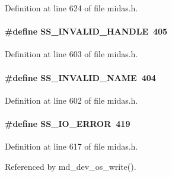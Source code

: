\begin{DoxyItemize}
\item 
\end{DoxyItemize}

Definition at line 624 of file midas.h.
\paragraph[{SS\_\-INVALID\_\-HANDLE}]{\setlength{\rightskip}{0pt plus 5cm}\#define SS\_\-INVALID\_\-HANDLE~405}\hfill\label{group__err24_ga43a0d1263dfc7b732dbb04271d8599c9}

\begin{DoxyItemize}
\item 
\end{DoxyItemize}

Definition at line 603 of file midas.h.
\paragraph[{SS\_\-INVALID\_\-NAME}]{\setlength{\rightskip}{0pt plus 5cm}\#define SS\_\-INVALID\_\-NAME~404}\hfill\label{group__err24_ga77e57c8c5c8a676e50f7b757294044f5}

\begin{DoxyItemize}
\item 
\end{DoxyItemize}

Definition at line 602 of file midas.h.
\paragraph[{SS\_\-IO\_\-ERROR}]{\setlength{\rightskip}{0pt plus 5cm}\#define SS\_\-IO\_\-ERROR~419}\hfill\label{group__err24_gaba97d9c5175be9b9573f28e2bec7ec9c}

\begin{DoxyItemize}
\item 
\end{DoxyItemize}

Definition at line 617 of file midas.h.

Referenced by md\_\-dev\_\-os\_\-write().
